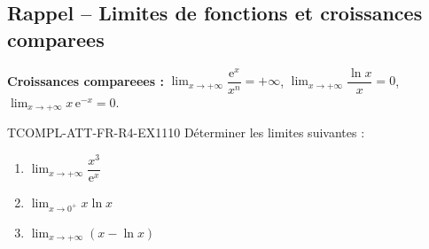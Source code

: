 

\subsection*{Rappel -- Limites de fonctions et croissances comparees}

\textbf{Croissances compareees :} $\lim_{x \to +\infty} \dfrac{\mathrm{e}^x}{x^n} = +\infty$, $\lim_{x \to +\infty} \dfrac{\ln x}{x} = 0$, $\lim_{x \to +\infty} x\,\mathrm{e}^{-x} = 0$.

\begin{exercice}{TCOMPL-ATT-FR-R4-EX1}{1}{10}
Déterminer les limites suivantes :
\begin{enumerate}
  \item $\lim_{x \to +\infty} \dfrac{x^3}{\mathrm{e}^x}$
  \item $\lim_{x \to 0^+} x \ln x$
  \item $\lim_{x \to +\infty} \left(x - \ln x\right)$
\end{enumerate}
\end{exercice}

